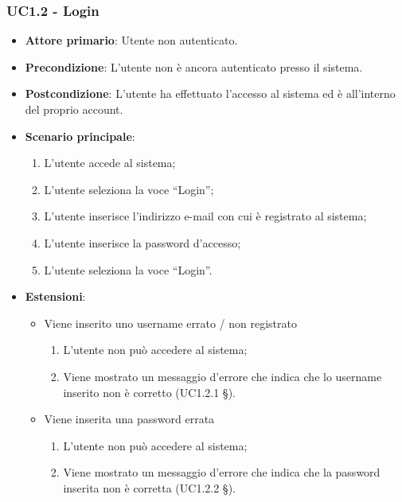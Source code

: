 \subsubsection{UC1.2 - Login}
\begin{itemize}
\item \textbf{Attore primario}: Utente non autenticato.
\item \textbf{Precondizione}: L'utente non è ancora autenticato presso il sistema.
\item \textbf{Postcondizione}: L’utente ha effettuato l’accesso al sistema ed è all’interno del proprio account.

\item \textbf{Scenario principale}:
\begin{enumerate}
\item L’utente accede al sistema;
\item L’utente seleziona la voce “Login”;
\item L’utente inserisce l’indirizzo e-mail con cui è registrato al sistema;
\item L’utente inserisce la password d’accesso; 
\item L’utente seleziona la voce “Login”. 
\end{enumerate}

\item \textbf{Estensioni}:
\begin{itemize}
\item Viene inserito uno username errato / non registrato
\begin{enumerate}
	\item L’utente non può accedere al sistema;
	\item Viene mostrato un messaggio d’errore che indica che lo username inserito non è corretto (UC1.2.1 §). 
\end{enumerate}
\item Viene inserita una password errata
\begin{enumerate}
	\item L’utente non può accedere al sistema;
	\item Viene mostrato un messaggio d’errore che indica che la password inserita non è corretta (UC1.2.2 §).
\end{enumerate}
\end{itemize}
\end{itemize}

